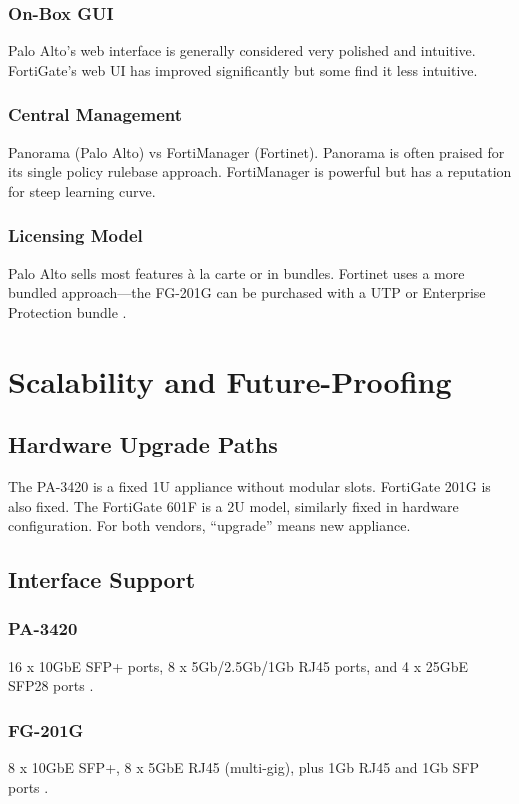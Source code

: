 \documentclass[12pt]{article}
\begin{document}
\subsubsection{On-Box GUI}
Palo Alto's web interface is generally considered very polished and intuitive. FortiGate's web UI has improved significantly but some find it less intuitive.

\subsubsection{Central Management}
Panorama (Palo Alto) vs FortiManager (Fortinet). Panorama is often praised for its single policy rulebase approach. FortiManager is powerful but has a reputation for steep learning curve.

\subsubsection{Licensing Model}
Palo Alto sells most features à la carte or in bundles. Fortinet uses a more bundled approach—the FG-201G can be purchased with a UTP or Enterprise Protection bundle \cite{fortinetbundles2024}.

\section{Scalability and Future-Proofing}

\subsection{Hardware Upgrade Paths}

The PA-3420 is a fixed 1U appliance without modular slots. FortiGate 201G is also fixed. The FortiGate 601F is a 2U model, similarly fixed in hardware configuration. For both vendors, ``upgrade'' means new appliance.

\subsection{Interface Support}

\subsubsection{PA-3420}
16 x 10GbE SFP+ ports, 8 x 5Gb/2.5Gb/1Gb RJ45 ports, and 4 x 25GbE SFP28 ports \cite{pa3400datasheet} \cite{pa3420cdw}.

\subsubsection{FG-201G}
8 x 10GbE SFP+, 8 x 5GbE RJ45 (multi-gig), plus 1Gb RJ45 and 1Gb SFP ports \cite{fortigate201gavfirewalls}.
\end{document}
